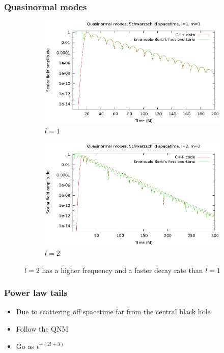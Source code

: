 \documentclass{beamer}
\begin{document}
\begin{frame}
  \frametitle{Quasinormal modes}
  \begin{figure}
    \centering
    \begin{subfigure}{.45\textwidth}
      \centering
      \includegraphics[width=\textwidth]{l1m1qnm}
      \caption{$l=1$}
    \end{subfigure}
    \begin{subfigure}{.45\textwidth}
      \centering
      \includegraphics[width=\textwidth]{l2m2qnm}
      \caption{$l=2$}
    \end{subfigure}
  \caption{$l=2$ has a higher frequency and a faster decay rate than $l=1$}
  \end{figure}
\end{frame}

\begin{frame}
  \frametitle{Power law tails}
  \begin{itemize}
  \item Due to scattering off spacetime far from the central black hole
  \item Follow the QNM
  \item Go as $t^{-(2l+3)}$
  \end{itemize}
\end{frame}
\end{document}
